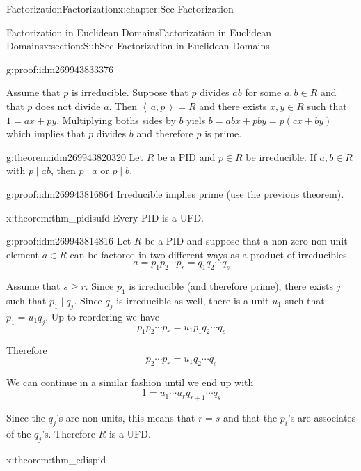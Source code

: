 \documentclass[oneside,10pt,]{book}
\numberwithin{equation}{section}
\renewcommand{\geq}{\geqslant}
\newcommand{\ideal}[1]{\left\langle\, #1 \,\right\rangle}
\begin{document}
\begin{chapterptx}{Factorization}{}{Factorization}{}{}{x:chapter:Sec-Factorization}
\begin{sectionptx}{Factorization in Euclidean Domains}{}{Factorization in Euclidean Domains}{}{}{x:section:SubSec-Factorization-in-Euclidean-Domains}
\begin{proofptx}{}{g:proof:idm269943833376}
\par
Assume that \(p\) is irreducible. Suppose that \(p\) divides \(ab\) for some \(a,b \in R\) and that \(p\) does not divide \(a\). Then \(\ideal{a,p}=R\) and there exists \(x,y\in R\) such that \(1=ax+py\). Multiplying boths sides by \(b\) yiels \(b=abx+pby=p(cx+by)\) which implies that \(p\) divides \(b\) and therefore \(p\) is prime.%
\end{proofptx}
\begin{theorem}{}{}{g:theorem:idm269943820320}%
Let \(R\) be a PID and \(p\in R\) be irreducible. If \(a,b\in R\) with \(p\mid ab\), then \(p\mid a\) or \(p\mid b\).%
\end{theorem}
\begin{proofptx}{}{g:proof:idm269943816864}
Irreducible implies prime (use the previous theorem).%
\end{proofptx}
\begin{theorem}{}{}{x:theorem:thm_pidisufd}%
Every PID is a UFD.%
\end{theorem}
\begin{proofptx}{}{g:proof:idm269943814816}
Let \(R\) be a PID and suppose that a non-zero non-unit element \(a\in R\) can be factored in two different ways as a product of irreducibles.%
\begin{equation*}
a=p_1p_2\cdots p_r=q_1q_2\cdots q_s
\end{equation*}
%
\par
Assume that \(s\geq r\). Since \(p_1\) is irreducible (and therefore prime), there exists \(j\) such that \(p_1 \mid q_j\). Since \(q_j\) is irreducible as well, there is a unit \(u_1\) such that \(p_1=u_1 q_j\). Up to reordering we have%
\begin{equation*}
p_1p_2\cdots p_r=u_1p_1q_2\cdots q_s
\end{equation*}
%
\par
Therefore%
\begin{equation*}
p_2\cdots p_r=u_1q_2\cdots q_s
\end{equation*}
%
\par
We can continue in a similar fashion until we end up with%
\begin{equation*}
1=u_1\cdots u_rq_{r+1}\cdots q_s
\end{equation*}
%
\par
Since the \(q_j\)'s are non-units, this means that \(r=s\) and that the \(p_i\)'s are associates of the \(q_j\)'s. Therefore \(R\) is a UFD.%
\end{proofptx}
\begin{theorem}{}{}{x:theorem:thm_edispid}%

\end{theorem}
\end{sectionptx}
\end{chapterptx}
\end{document}
